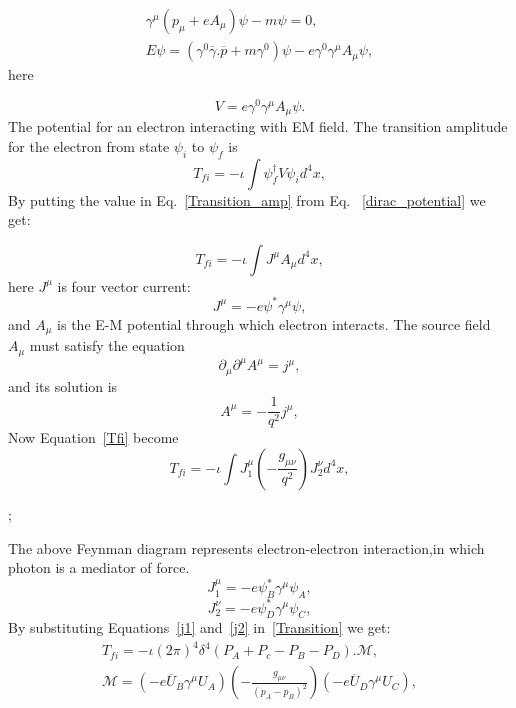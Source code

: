 \begin{eqnarray}
\gamma^{\mu}(p_{\mu}+eA_{\mu})\psi-m\psi=0,\\
E\psi=(\gamma^{0}\overline{\gamma}.\overline{p}+m\gamma^{0})\psi-e\gamma^{0}\gamma^{\mu}A_{\mu}\psi,
\end{eqnarray}
here 

\begin{equation}\label{dirac_potential}
V= e\gamma^{0}\gamma^{\mu} A_{\mu} \psi.
\end{equation}
The potential for an electron interacting with EM field. The transition amplitude for the electron from state $\psi_{i}$ to $\psi_{f}$ is 
\begin{equation}\label{Transition_amp}
T_{fi}=-\iota\int\psi_{f}^{\dagger}V\psi_{i}d^{4}x,
\end{equation}
By putting the value in Eq.~\ref{Transition_amp} from Eq.~ \ref{dirac_potential} we get:

\begin{equation}\label{Tfi}
T_{fi}=-\iota\int J^{\mu}A_{\mu}d^{4}x,
\end{equation}
here $J^{\mu}$ is four vector current:
\begin{equation}
J^{\mu}=-e\psi^{*}\gamma^{\mu}\psi,
\end{equation}
and $A_{\mu}$ is the E-M potential through which electron interacts. The source field $A_{\mu}$ must satisfy the equation
\begin{equation}
\partial_{\mu}\partial^{\mu}A^{\mu}=j^{\mu},
\end{equation}
and its solution is 
\begin{equation}
A^{\mu}=-\frac{1}{q^{2}}j^{\mu},
\end{equation}
Now Equation~\ref{Tfi} become 
\begin{equation}\label{Transition}
T_{fi}=-\iota\int J_{1}^{\mu}(-\frac{g_{\mu\nu}}{q^{2}})J_{2}^{\nu}d^{4}x,
\end{equation}
\begin{center}
;
\end{center}
The above Feynman diagram represents electron-electron interaction,in which photon is a mediator of force.\\
\begin{equation}\label{j1}
J_{1}^{\mu}=-e \psi_{B}^{*}\gamma^{\mu}\psi_{A},
\end{equation}
\begin{equation}\label{j2}
J_{2}^{\nu}=-e \psi_{D}^{*}\gamma^{\mu}\psi_{C},
\end{equation}
By substituting Equations~\ref{j1} and~\ref{j2} in~\ref{Transition} we get:
\begin{eqnarray}
T_{fi}=-\iota(2\pi)^{4}\delta^{4}(P_{A}+P_{c}-P_{B}-P_{D}).\mathcal{M},\\
\mathcal{M}=(-e\overline{U}_{B}\gamma^{\mu}U_{A})(-\frac{g_{\mu\nu}}{(p_{A}-p_{B})^2})(-e\overline{U}_{D}\gamma^{\mu}U_{C}),
\end{eqnarray}

